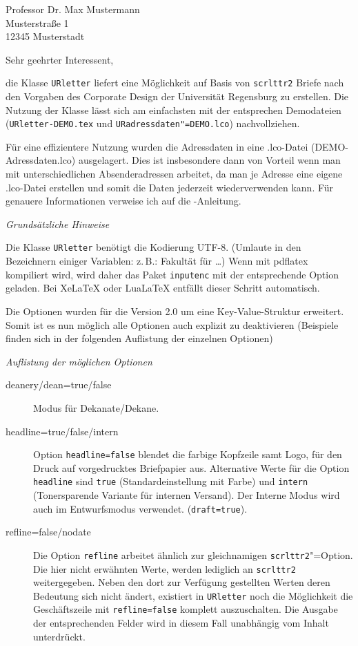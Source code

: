 \documentclass[english,parskip=half,colors={faculties,rz},headline=color]{URletter}
\newcommand*\pck[1]{\texttt{#1}}
\newcommand*\code[1]{\texttt{#1}}
\newcommand*\heading[1]{\par\bigskip\emph{#1}\par\nobreak}
\begin{document}
	

\begin{letter}{Professor Dr. Max Mustermann\\Musterstraße 1\\12345 Musterstadt}



\opening{Sehr geehrter Interessent,}

die Klasse \pck{URletter} liefert eine Möglichkeit auf Basis von \pck{scrlttr2} Briefe nach den Vorgaben des Corporate Design der Universität Regensburg zu erstellen. Die Nutzung der Klasse lässt sich am einfachsten mit der entsprechen Demodateien (\code{URletter-DEMO.tex} und \code{URadressdaten"=DEMO.lco}) nachvollziehen.

Für eine effizientere Nutzung wurden die Adressdaten in eine .lco-Datei (DEMO-Adressdaten.lco) ausgelagert. Dies ist insbesondere dann von Vorteil wenn man mit unterschiedlichen Absenderadressen arbeitet, da man je Adresse eine eigene .lco-Datei erstellen und somit die Daten jederzeit wiederverwenden kann. Für genauere Informationen verweise ich auf die \KOMAScript-Anleitung.

\heading{Grundsätzliche Hinweise}
Die Klasse \pck{URletter} benötigt die Kodierung UTF-8. (Umlaute in den Bezeichnern einiger Variablen: z.\,B.: \glqq{}Fakultät für \ldots\grqq) Wenn mit pdflatex kompiliert wird, wird daher das Paket \pck{inputenc} mit der entsprechende Option geladen. Bei Xe\LaTeX{} oder Lua\LaTeX{} entfällt dieser Schritt automatisch.

Die Optionen wurden für die Version 2.0 um eine Key-Value-Struktur erweitert. Somit ist es nun möglich alle Optionen auch explizit zu deaktivieren (Beispiele finden sich in der folgenden Auflistung der einzelnen Optionen)


\heading{Auflistung der möglichen Optionen}
\begin{description}
	\item[deanery/dean=true/false] Modus für Dekanate/Dekane.
	\item[headline=true/false/intern] Option \code{headline=false} blendet die farbige Kopfzeile samt Logo, für den Druck auf vorgedrucktes Briefpapier aus. Alternative Werte für die Option \code{headline} sind \code{true} (Standardeinstellung mit Farbe) und \code{intern} (Tonersparende Variante für internen Versand). Der Interne Modus wird auch im Entwurfsmodus verwendet. (\code{draft=true}).
	\item[refline=false/nodate] Die Option \texttt{refline} arbeitet ähnlich zur gleichnamigen \pck{scrlttr2}"=Option. Die hier nicht erwähnten Werte, werden lediglich an \pck{scrlttr2} weitergegeben. Neben den dort zur Verfügung gestellten Werten deren Bedeutung sich nicht ändert,  existiert in \pck{URletter} noch die Möglichkeit die Geschäftszeile mit \code{refline=false} komplett auszuschalten. Die Ausgabe der entsprechenden Felder wird in diesem Fall unabhängig vom Inhalt unterdrückt.
	

\end{description}
\end{letter}
\end{document}
